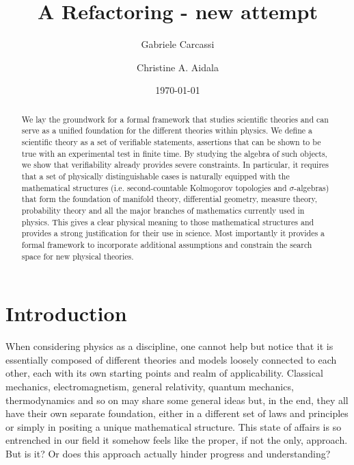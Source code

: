 \documentclass[letterpaper]{article}
\begin{document}
\title{A Refactoring - new attempt}


\author{Gabriele Carcassi}
\author{Christine A. Aidala}

\date{\today}

\begin{abstract}
	We lay the groundwork for a formal framework that studies scientific theories and can serve as a unified foundation for the different theories within physics. We define a scientific theory as a set of verifiable statements, assertions that can be shown to be true with an experimental test in finite time. By studying the algebra of such objects, we show that verifiability already provides severe constraints. In particular, it requires that a set of physically distinguishable cases is naturally equipped with the mathematical structures (i.e. second-countable Kolmogorov topologies and $\sigma$-algebras) that form the foundation of manifold theory, differential geometry, measure theory, probability theory and all the major branches of mathematics currently used in physics. This gives a clear physical meaning to those mathematical structures and provides a strong justification for their use in science. Most importantly it provides a formal framework to incorporate additional assumptions and constrain the search space for new physical theories.
\end{abstract}

\maketitle


\section{Introduction}

When considering physics as a discipline, one cannot help but notice that it is essentially composed of different theories and models loosely connected to each other, each with its own starting points and realm of applicability. Classical mechanics, electromagnetism, general relativity, quantum mechanics, thermodynamics and so on may share some general ideas but, in the end, they all have their own separate foundation, either in a different set of laws and principles or simply in positing a unique mathematical structure. This state of affairs is so entrenched in our field it somehow feels like the proper, if not the only, approach. But is it? Or does this approach actually hinder progress and understanding?
\end{document}
